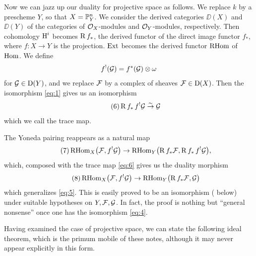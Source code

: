 Now we can jazz up our duality for projective space as follows. We replace $k$ by a prescheme $Y$, so that $X=\mathbb{P}_{Y}^{n}$. We consider the derived categories $\DD(X)$ and $\DD(Y)$ of the categories of $\mathcal{O}_{X}$-modules and $\mathcal{O}_{Y}$-modules, respectively. Then cohomology $\operatorname{H}^{i}$ becomes $\operatorname{R} f_{*}$, the derived functor of the direct image functor $f_{*}$, where $f\colon X\to Y$ is the projection. $\operatorname{Ext}$ becomes the derived functor $\operatorname{RHom}$ of $\operatorname{Hom}$. We define
\[
f^{!}(\mathcal{G})=f^{*}(\mathcal{G})\otimes\omega
\]
for $\mathcal{G}\in \operatorname{D}(Y)$, and we replace $\mathcal{F}$ by a complex of sheaves $\mathcal{F}\in \operatorname{D}(X)$. Then the isomorphism \eqref{eq:1} gives us an isomorphism
\begin{equation}\tag{6}\label{eq:6}
	\operatorname{R} f_{*}\,f^{!}\mathcal{G}\stackrel{\sim}{\to}\mathcal{G}
\end{equation}
which we call the trace map.

The Yoneda pairing reappears as a natural map
\begin{equation}\tag{7}\label{eq:7}
	\operatorname{RHom}_{X}\bigl(\mathcal{F},f^{!}\mathcal{G}\bigr)\to \operatorname{RHom}_{Y}\bigl(\operatorname{R} f_{*}\mathcal{F},\operatorname{R} f_{*}\,f^{!}\mathcal{G}\bigr),
\end{equation}
which, composed with the trace map \eqref{eq:6} gives us the duality morphism
\begin{equation}\tag{8}\label{eq:8}
	\operatorname{RHom}_{X}\bigl(\mathcal{F},f^{!}\mathcal{G}\bigr)\to \operatorname{RHom}_{Y}\bigl(\operatorname{R} f_{*}\mathcal{F},\mathcal{G}\bigr)
\end{equation}
which generalizes \eqref{eq:5}. This is easily proved to be an isomorphism ( below) under suitable hypotheses on $Y,\mathcal{F},\mathcal{G}$. In fact, the proof is nothing but ``general nonsense'' once one has the isomorphism \eqref{eq:4}.

Having examined the case of projective space, we can state the following ideal theorem, which is the primum mobile of these notes, although it may never appear explicitly in this form.

